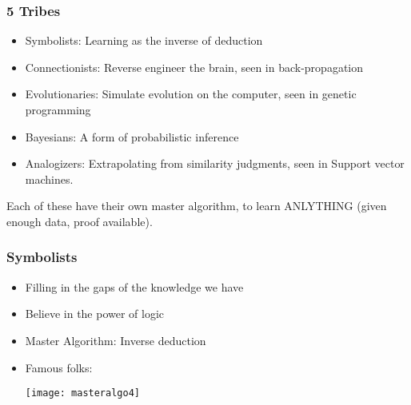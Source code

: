 \begin{frame}[fragile]\frametitle{5 Tribes}
  \begin{itemize}
    \item Symbolists: Learning as the inverse of deduction
	\item Connectionists: Reverse engineer the brain, seen in back-propagation
	\item Evolutionaries: Simulate evolution on the computer, seen in genetic programming
	\item Bayesians: A form of probabilistic inference
	\item Analogizers: Extrapolating from similarity judgments, seen in Support vector machines.
  \end{itemize}
  
  Each of these have their own master algorithm, to learn ANLYTHING (given enough data, proof available).
\end{frame}

\begin{frame}[fragile]\frametitle{Symbolists}
  \begin{itemize}
    \item Filling in the gaps of the knowledge we have
	\item Believe in the power of logic
	\item Master Algorithm: Inverse deduction
	\item Famous folks:
	
	 \begin{center}
\texttt{[image: masteralgo4]}
\end{center}

  \end{itemize}


  
\end{frame}

